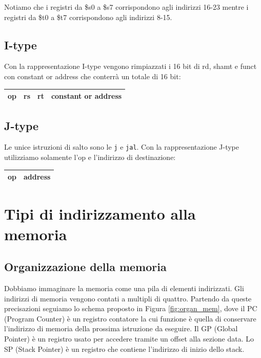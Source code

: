 Notiamo che i registri da \$s0 a \$s7 corrispondono agli indirizzi 16-23 mentre i registri da \$t0 a \$t7 corrispondono agli indirizzi 8-15.

\subsection*{I-type}
Con la rappresentazione I-type vengono rimpiazzati i 16 bit di rd, shamt e funct con constant or address che conterrà un totale di 16 bit:

\begin{table}[H]
    \centering
    \begin{tabular}{|p{1.5cm}|p{1.5cm}|p{1.5cm}|p{4.5cm}|}
         \hline \large{op} & \large{rs} & \large{rt} & \large{constant or address}\\\hline
    \end{tabular}
\end{table}


\subsection*{J-type}
Le unice istruzioni di salto sono le \verb|j| e \verb|jal|. Con la rappresentazione J-type utilizziamo solamente l'op e l'indirizzo di destinazione:
\begin{table}[H]
    \centering
    \begin{tabular}{|p{1.5cm}|p{7.5cm}|}
         \hline \large{op} & \large{\hspace{3cm} address}\\\hline
    \end{tabular}
\end{table}

\section{Tipi di indirizzamento alla memoria}
\subsection*{Organizzazione della memoria}
Dobbiamo immaginare la memoria come una pila di elementi indirizzati. Gli indirizzi di memoria vengono contati a multipli di quattro. Partendo da queste precisazioni seguiamo lo schema proposto in Figura \ref{fig:organ_mem}, dove il PC (Program Counter) è un registro contatore la cui funzione è quella di conservare l'indirizzo di memoria della prossima istruzione da eseguire. Il GP (Global Pointer) è un registro usato per accedere tramite un offset
alla sezione data. Lo SP (Stack Pointer) è un registro che contiene l’indirizzo di inizio dello stack.

